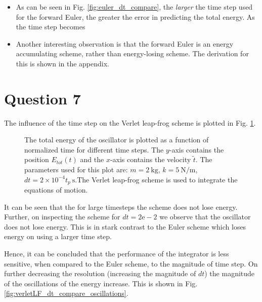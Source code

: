 \documentclass[10pt]{article}
\begin{document}
\begin{itemize}
\item As can be seen in Fig. \ref{fig:euler_dt_compare}, the \emph{larger} the time step used for the forward Euler, the greater the error in predicting the total energy. As the time step becomes 
\item Another interesting observation is that the forward Euler is an energy accumulating scheme, rather than energy-losing scheme. The derivation for this is shown in the appendix.
\end{itemize}

\section*{Question 7}
The influence of the time step on the Verlet leap-frog scheme is plotted in Fig. \ref{fig:verletLF_dt_compare}. 

\begin{figure}[!htb]
\centering

\caption{The total energy of the oscillator is plotted as a function of normalized time for different time steps. The $y$-axis contains the position $E_{tot}(t)$ and the $x$-axis contains the velocity $\tilde{t}$. The parameters used for this plot are: $m=2\ \mathrm{kg}$, $k=5\ \mathrm{N/m}$, $dt=2\times 10^{-4}t_{p}\ \mathrm{s}$.The Verlet leap-frog scheme is used to integrate the equations of motion.}
\label{fig:verletLF_dt_compare}
\end{figure}

It can be seen that the for large timesteps the scheme does not lose energy. Further, on inspecting the scheme for $dt=2\mathrm{e-}2$ we observe that the oscillator does not lose energy. This is in stark contrast to the Euler scheme which loses energy on using a larger time step. 

Hence, it can be concluded that the performance of the integrator is less sensitive, when compared to the Euler scheme, to the magnitude of time step. On further decreasing the resolution (increasing the magnitude of $dt$) the magnitude of the oscillations of the energy increase. This is shown in Fig. \ref{fig:verletLF_dt_compare_oscillations}.

\iffalse
\begin{figure}[!htb]
\centering

\caption{The total energy of the oscillator is plotted as a function of normalized time for different time steps. The $y$-axis contains the position $E_{tot}(t)$ and the $x$-axis contains the velocity $\tilde{t}$. The parameters used for this plot are: $m=2\ \mathrm{kg}$, $k=5\ \mathrm{N/m}$, $dt=2\times 10^{-4}t_{p}\ \mathrm{s}$.The Verlet leap-frog scheme is used to integrate the equations of motion.}
\label{fig:verletLF_dt_compare_oscillations}
\end{figure}
\fi
\end{document}
